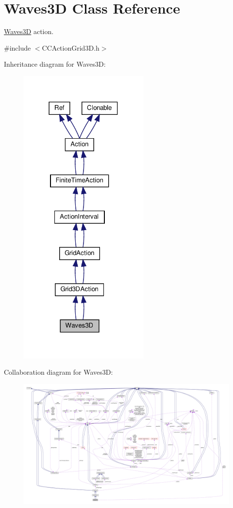 \hypertarget{classWaves3D}{}\section{Waves3D Class Reference}
\label{classWaves3D}


\hyperlink{classWaves3D}{Waves3D} action.  




{\ttfamily \#include $<$C\+C\+Action\+Grid3\+D.\+h$>$}



Inheritance diagram for Waves3D\+:
\nopagebreak
\begin{figure}[H]
\begin{center}
\leavevmode
\includegraphics[width=186pt]{classWaves3D__inherit__graph}
\end{center}
\end{figure}


Collaboration diagram for Waves3D\+:
\nopagebreak
\begin{figure}[H]
\begin{center}
\leavevmode
\includegraphics[width=350pt]{classWaves3D__coll__graph}
\end{center}
\end{figure}
